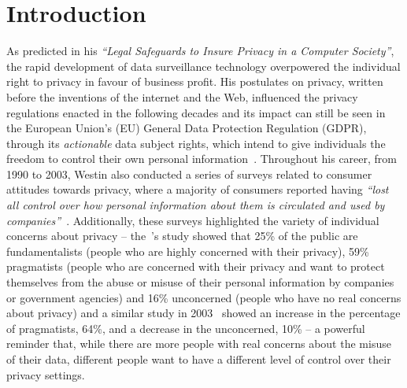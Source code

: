 \chapter{Introduction}
\label{chap:intro}


As \cite{westin_legal_1967} predicted in his \textit{``Legal Safeguards to Insure Privacy in a Computer Society''}, the rapid development of data surveillance technology overpowered the individual right to privacy in favour of business profit.
His postulates on privacy, written before the inventions of the internet and the Web, influenced the privacy regulations enacted in the following decades and its impact can still be seen in the European Union's (EU) General Data Protection Regulation (GDPR), through its \textit{actionable} data subject rights, which intend to give individuals the freedom to control their own personal information~\citep{westin_privacy_1967}.
Throughout his career, from 1990 to 2003, Westin also conducted a series of surveys related to consumer attitudes towards privacy, where a majority of consumers reported having \textit{``lost all control over how personal information about them is circulated and used by companies''}~\citep{kumaraguru_privacy_2005}.
Additionally, these surveys highlighted the variety of individual concerns about privacy -- the~\citeyear{westin_equifax-harris_1996}'s study showed that 25\% of the public are fundamentalists (people who are highly concerned with their privacy), 59\% pragmatists (people who are concerned with their privacy and want to protect themselves from the abuse or misuse of their personal information by companies or government agencies) and 16\% unconcerned (people who have no real concerns about privacy) and a similar study in 2003~\citep{taylor_most_2003} showed an increase in the percentage of pragmatists, 64\%, and a decrease in the unconcerned, 10\% -- a powerful reminder that, while there are more people with real concerns about the misuse of their data, different people want to have a different level of control over their privacy settings.

